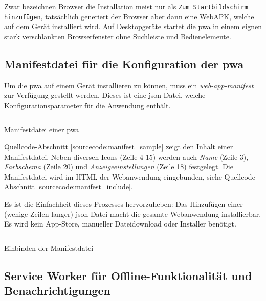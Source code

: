 Zwar bezeichnen Browser die Installation meist nur als \texttt{Zum Startbildschirm hinzufügen}, tatsächlich generiert der Browser aber dann eine WebAPK, welche auf dem Gerät installiert wird. Auf Desktopgeräte startet die \ac{pwa} in einem eignen stark verschlankten Browserfenster ohne Suchleiste und Bedienelemente. \cite{GooglePWAInstallation}


\subsection{Manifestdatei für die Konfiguration der \ac{pwa}}

Um die \ac{pwa} auf einem Gerät installieren zu können, muss ein \textit{web-app-manifest} zur Verfügung gestellt werden. Dieses ist eine \ac{json} Datei, welche Konfigurationsparameter für die Anwendung enthält. \cite{GooglePWAManifest}

\begin{listing}[h!]
    \inputminted{json}{sourcecode/manifest_sample.json}
    \caption{Manifestdatei einer \ac{pwa}}
      \label{sourcecode:manifest_sample}
\end{listing}

Quellcode-Abschnitt \ref{sourcecode:manifest_sample} zeigt den Inhalt einer Manifestdatei. Neben diversen Icons (Zeile 4-15) werden auch \textit{Name} (Zeile 3), \textit{Farbschema} (Zeile 20) und \textit{Anzeigeeinstellungen} (Zeile 18) festgelegt.
Die Manifestdatei wird im HTML der Webanwendung eingebunden, siehe Quellcode-Abschnitt \ref{sourcecode:manifest_include}. 

Es ist die Einfachheit dieses Prozesses hervorzuheben: Das Hinzufügen einer (wenige Zeilen langer) \ac{json}-Datei macht die gesamte Webanwendung installierbar. Es wird kein App-Store, manueller Dateidownload oder Installer benötigt. 

\begin{listing}[H]
    \inputminted{xml}{sourcecode/include_manifest.html}
    \caption{Einbinden der Manifestdatei}
      \label{sourcecode:manifest_include}
\end{listing}

\subsection{Service Worker für Offline-Funktionalität und Benachrichtigungen}
\label{chap:service_worker}

